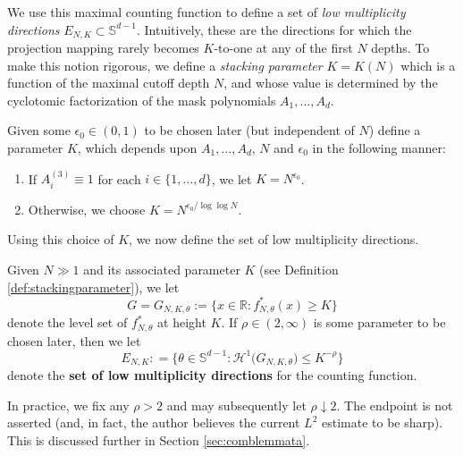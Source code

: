 \documentclass[12pt]{amsart}
\numberwithin{equation}{section}
\begin{document}
We use this maximal counting function to define a set of \textit{low multiplicity directions} $E_{N,K} \subset \mathbb{S}^{d-1}$. Intuitively, these are the directions for which the projection mapping rarely becomes $K$-to-one at any of the first $N$ depths. To make this notion rigorous, we define a \textit{stacking parameter} $K = K(N)$ which is a function of the maximal cutoff depth $N$, and whose value is determined by the cyclotomic factorization of the mask polynomials $A_1,...,A_d$.

\medskip

\begin{definition}\label{def:stackingparameter}
    Given some $\epsilon_0 \in (0,1)$ to be chosen later (but independent of $N$) define a parameter $K$, which depends upon $A_1,...,A_d$, $N$ and $\epsilon_0$ in the following manner:
    \begin{enumerate}
        \item If $A_i^{(3)} \equiv 1$ for each $i \in \{1,...,d\}$, we let $K = N^{\epsilon_0}$.
        \medskip
        \item Otherwise, we choose $K = N^{\epsilon_0/\log \log N}$.
    \end{enumerate}
\end{definition}

Using this choice of $K$, we now define the set of low multiplicity directions.

\medskip

\begin{definition}\label{ch3:def:lowmultiplicity}
Given $N \gg 1$ and its associated parameter $K$ (see Definition \ref{def:stackingparameter}), we let
$$
G = G_{N,K,\theta} := \{x \in \mathbb{R} : f_{N,\theta}^* (x) \geq K \}
$$
denote the level set of $f_{N,\theta}^*$ at height $K$. If $\rho \in (2, \infty)$ is some parameter to be chosen later, then we let
\begin{equation}\label{eq:lowmultfirsttime}
E_{N, K} : = \{\theta \in \mathbb{S}^{d-1} : \mathcal{H}^1 \big(G_{N,K,\theta}) \leq K^{-\rho} \}
\end{equation}
denote the \textbf{set of low multiplicity directions} for the counting function.
\end{definition}

In practice, we fix any $\rho>2$ and may subsequently let $\rho\downarrow2$.
The endpoint is not asserted (and, in fact, the author believes the current $L^2$ estimate to be sharp).  This is discussed further in Section \ref{sec:comblemmata}.
\end{document}
